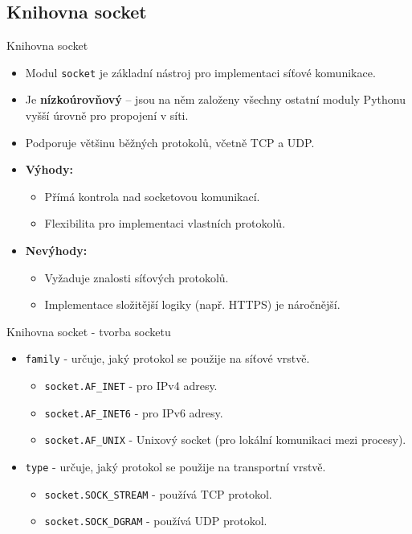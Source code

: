 \documentclass{beamer}
\begin{document}
\subsection{Knihovna socket}
\begin{frame}{Knihovna socket}
	\begin{itemize}
		\item Modul \texttt{socket} je základní nástroj pro implementaci síťové komunikace.
		\item Je \textbf{nízkoúrovňový} – jsou na něm založeny všechny ostatní moduly Pythonu vyšší úrovně pro propojení v síti.
		\item Podporuje většinu běžných protokolů, včetně TCP a UDP.
		\item \textbf{Výhody:}
		\begin{itemize}
			\item Přímá kontrola nad socketovou komunikací.
			\item Flexibilita pro implementaci vlastních protokolů.
		\end{itemize}
		\item \textbf{Nevýhody:}
		\begin{itemize}
			\item Vyžaduje znalosti síťových protokolů.
			\item Implementace složitější logiky (např. HTTPS) je náročnější.
		\end{itemize}
	\end{itemize}
\end{frame}

\begin{frame}{Knihovna socket - tvorba socketu}
	\begin{itemize}
		import socket

		socket = socket.socket(
			family=AF_INET,
			type=SOCK_STREAM
		)

		\item \texttt{family}  - určuje, jaký protokol se použije na síťové vrstvě.
		\begin{itemize}
			\item \texttt{socket.AF_INET} - pro IPv4 adresy.
			\item \texttt{socket.AF_INET6} - pro IPv6 adresy.
			\item \texttt{socket.AF_UNIX} - Unixový socket (pro lokální komunikaci mezi procesy).
		\end{itemize}
		\item \texttt{type} - určuje, jaký protokol se použije na transportní vrstvě.
		\begin{itemize}
			\item \texttt{socket.SOCK_STREAM} - používá TCP protokol.
			\item \texttt{socket.SOCK_DGRAM} - používá UDP protokol.
		\end{itemize}
	\end{itemize}
\end{frame}
\end{document}
